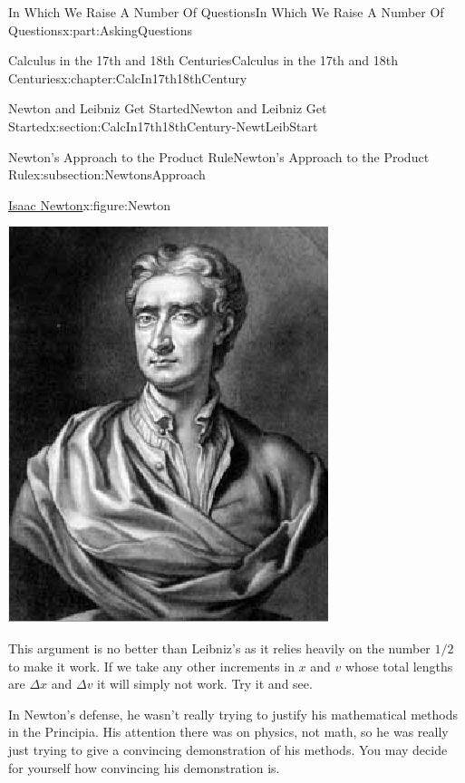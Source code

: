 \documentclass[oneside,10pt,]{book}
\numberwithin{equation}{section}
\begin{document}
\begin{partptx}{In Which We Raise A Number Of Questions}{}{In Which We Raise A Number Of Questions}{}{}{x:part:AskingQuestions}
\begin{chapterptx}{Calculus in the 17th and 18th Centuries}{}{Calculus in the 17th and 18th Centuries}{}{}{x:chapter:CalcIn17th18thCentury}
\begin{sectionptx}{Newton and Leibniz Get Started}{}{Newton and Leibniz Get Started}{}{}{x:section:CalcIn17th18thCentury-NewtLeibStart}
\begin{subsectionptx}{Newton's Approach to the Product Rule}{}{Newton's Approach to the Product Rule}{}{}{x:subsection:NewtonsApproach}
\begin{figureptx}{\href{https://mathshistory.st-andrews.ac.uk/Biographies/Newton/}{Isaac Newton}\protect\footnotemark{}}{x:figure:Newton}{}
\begin{image}{0.325}{0.35}{0.325}
\includegraphics[width=\linewidth]{images/Newton.png}
\end{image}%
\tcblower
\end{figureptx}%
%
This argument is no better than Leibniz's as it relies heavily on the number \(1/2\) to make it work.  If we take any other increments in \(x\) and \(v\) whose total lengths are \(\Delta x\) and \(\Delta v\) it will simply not work.  Try it and see.%
\par
In Newton's defense, he wasn't really trying to justify his mathematical methods in the Principia.  His attention there was on physics, not math, so he was really just trying to give a convincing demonstration of his methods.  You may decide for yourself how convincing his demonstration is.%
\par

\end{subsectionptx}
\end{sectionptx}
\end{chapterptx}
\end{partptx}
\end{document}
